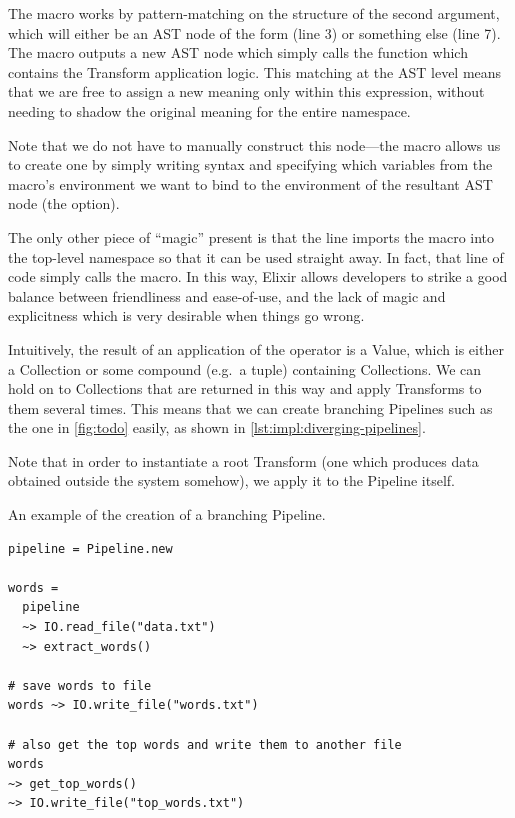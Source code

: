 The \exs{~>} macro works by pattern-matching on the structure of the second argument, which will either be an AST node of the form  (line 3) or something else (line 7).
The macro outputs a new AST node which simply calls the  function which contains the Transform application logic.
This matching at the AST level means that we are free to assign \exs{--} a new meaning only within this expression, without needing to shadow the original meaning for the entire namespace.

Note that we do not have to manually construct this node---the  macro allows us to create one by simply writing syntax and specifying which variables from the macro's environment we want to bind to the environment of the resultant AST node (the  option).

The only other piece of ``magic'' present is that the  line imports the \exs{~>} macro into the top-level namespace so that it can be used straight away.
In fact, that line of code simply calls the  macro.
In this way, Elixir allows developers to strike a good balance between friendliness and ease-of-use, and the lack of magic and explicitness which is very desirable when things go wrong.

Intuitively, the result of an application of the \exs{~>} operator is a Value, which is either a Collection or some compound (e.g.\ a tuple) containing Collections.
We can hold on to Collections that are returned in this way and apply Transforms to them several times.
This means that we can create branching Pipelines such as the one in \cref{fig:todo} easily, as shown in \cref{lst:impl:diverging-pipelines}.

Note that in order to instantiate a root Transform (one which produces data obtained outside the system somehow), we apply it to the Pipeline itself.

\begin{listing}[h]
	\caption{An example of the creation of a branching Pipeline.}
	\label{lst:impl:diverging-pipelines}
	\begin{verbatim}
pipeline = Pipeline.new

words =
  pipeline
  ~> IO.read_file("data.txt")
  ~> extract_words()
  
# save words to file
words ~> IO.write_file("words.txt")

# also get the top words and write them to another file
words
~> get_top_words()
~> IO.write_file("top_words.txt")
	\end{verbatim}
\end{listing}

